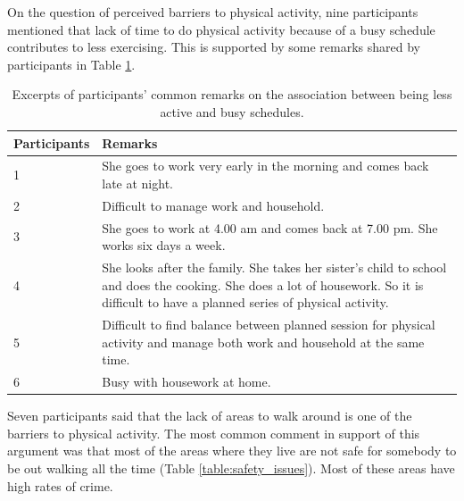 On the question of perceived barriers to physical activity, nine participants mentioned that lack of time to do physical activity because of a busy schedule contributes to less exercising. This is supported by some remarks shared by participants in Table \ref{table:busy_schedules}. 

\begin{table}[h!]
\begin{center}
    \caption{Excerpts of participants’ common remarks on the association between being less active and busy schedules.}
    \label{table:busy_schedules}
	\begin{tabular}{|p{2.5cm}|p{10.5cm}|}
		\hline
		 \textbf{Participants}&\textbf{Remarks}\\
	  \hline
	  1&She goes to work very early in the morning and comes back late at night.\\
	  \hline
	  2&Difficult to manage work and household.\\
	  \hline
	  3&She goes to work at 4.00 am and comes back at 7.00 pm. She works six days a week.\\
	  \hline
	  4&She looks after the family. She takes her sister's child to school and does the cooking. She does a lot of housework. So it is difficult to have a planned series of physical activity.\\
	  \hline
	 5&Difficult to find balance between planned session for physical activity and manage both work and household at the same time.\\
	 \hline
	 6&Busy with housework at home.\\
	 \hline
	\end{tabular}
  \end{center}
\end{table}

Seven participants said that the lack of areas to walk around is one of the barriers to physical activity. The most common comment in support of this argument was that most of the areas where they live are not safe for somebody to be out walking all the time (Table \ref{table:safety_issues}). Most of these areas have high rates of crime.

